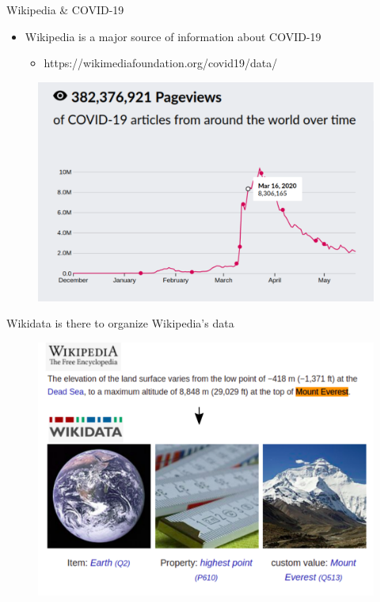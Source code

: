 \documentclass{beamer}
\begin{document}
\begin{frame}{Wikipedia \& COVID-19}

\begin{itemize}
    \item Wikipedia is a major source of information about COVID-19
    
    \begin{itemize}
        \item https://wikimediafoundation.org/covid19/data/
    \end{itemize}
    
\end{itemize}

\begin{figure}
\includegraphics[scale=0.45]{fig/wikipedia_access_covid_19.png}
\end{figure}
\end{frame}


\begin{frame}{Wikidata is there to organize Wikipedia's data}

\begin{figure}
\includegraphics[scale=0.45]{fig/intro wikidata.png}
\end{figure}

\end{frame}
\end{document}
